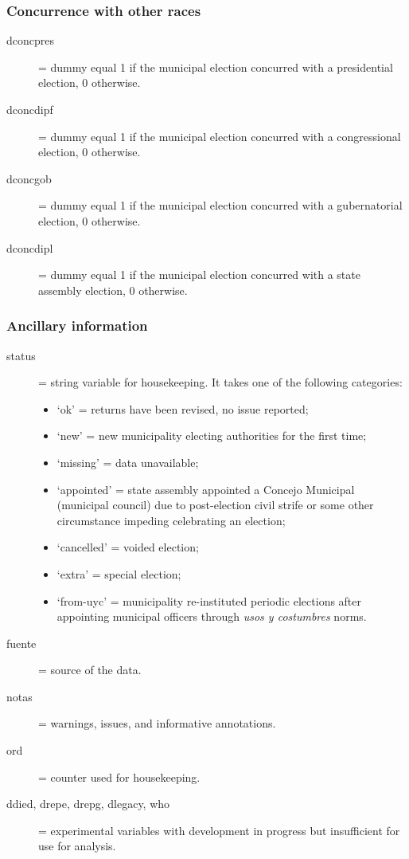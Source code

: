 \documentclass[letter,12pt]{article}
\begin{document}
\begin{singlespace}
\subsubsection{Concurrence with other races}
\begin{description}
\item[dconcpres] = dummy equal 1 if the municipal election concurred with a presidential election, 0 otherwise. 
\item[dconcdipf] = dummy equal 1 if the municipal election concurred with a congressional election, 0 otherwise. 
\item[dconcgob]  = dummy equal 1 if the municipal election concurred with a gubernatorial election, 0 otherwise. 
\item[dconcdipl] = dummy equal 1 if the municipal election concurred with a state assembly election, 0 otherwise. 
\end{description}
\subsubsection{Ancillary information}
\begin{description}
\item[status] = string variable for housekeeping. It takes one of the following categories:
  \begin{itemize}
  \item `ok' = returns have been revised, no issue reported;
  \item `new' = new municipality electing authorities for the first time;
  \item `missing' = data unavailable;
  \item `appointed' = state assembly appointed a Concejo Municipal (municipal council) due to post-election civil strife or some other circumstance impeding celebrating an election;
  \item `cancelled' = voided election;
  \item `extra' = special election;
  \item `from-uyc' = municipality re-instituted periodic elections after appointing municipal officers through \emph{usos y costumbres} norms.
  \end{itemize}
\item[fuente] = source of the data.
\item[notas] = warnings, issues, and informative annotations.
\item[ord] = counter used for housekeeping.
\item[ddied, drepe, drepg, dlegacy, who] = experimental variables with development in progress but insufficient for use for analysis.
\end{description}


\end{singlespace}
\end{document}
